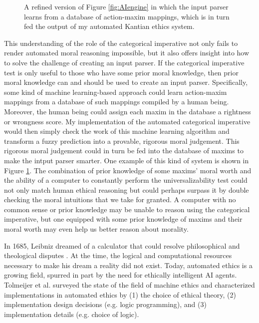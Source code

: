 \begin{isabellebody}
\begin{figure}
\caption{A refined version of Figure \ref{fig:AIengine} in which the input parser learns from a database
of action-maxim mappings, which is in turn fed the output of my automated Kantian ethics system. } \label{fig:inputparser}
\end{figure}
%
\begin{isamarkuptext}%
This understanding of the role of the categorical imperative not only fails to render automated moral
reasoning impossible, but it also offers insight into how to solve the challenge of creating an input parser.
If the categorical imperative test is only useful to those who have some prior moral knowledge, then prior moral
knowledge can and should be used to create an input parser. Specifically, some kind of machine learning-based approach
could learn action-maxim mappings from a database of such mappings compiled by a human being. Moreover, 
the human being could assign each maxim in the database a rightness or wrongness score. My implementation
of the automated categorical imperative would then simply check the work of this machine learning algorithm and transform
a fuzzy prediction into a provable, rigorous moral judgement. This rigorous moral judgement
could in turn be fed into the database of maxims to make the intput parser smarter. One example of 
this kind of system is shown in Figure \ref{fig:inputparser}. The combination of 
prior knowledge of some maxims' moral worth and the ability of a computer to constantly perform the
universalizability test could not only match human ethical reasoning but could perhaps surpass it
by double checking the moral intuitions that we take for granted. A computer with no common sense or prior knowledge
may be unable to reason using the categorical imperative, but one equipped with some prior knowledge
of maxims and their moral worth may even help us better reason about morality.%
\end{isamarkuptext}\isamarkuptrue%
%
\isadelimdocument
%
\endisadelimdocument
%
\isatagdocument
%
\isamarkuptrue%
%
\endisatagdocument
{\isafolddocument}%
%
\isadelimdocument
%
\endisadelimdocument
%
\begin{isamarkuptext}%
In 1685, Leibniz dreamed of a calculator that could resolve philosophical and theological 
disputes \citep{leibniz}. At the time, the logical and computational resources necessary to make his 
dream a reality did not exist. Today, automated ethics is a growing field, spurred in part by the 
need for ethically intelligent AI agents. Tolmeijer et al. surveyed the state of the field of 
machine ethics \citep{mesurvey} and characterized implementations in automated ethics by (1) the choice 
of ethical theory, (2) implementation design decisions (e.g. logic programming), and (3) implementation 
details (e.g. choice of logic). 


\end{isamarkuptext}
\end{isabellebody}
